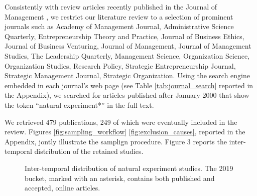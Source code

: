Consistently with review articles recently published in the Journal of
Management \parencite[e.g.][]{gonzalez2018,rindova2018}, we restrict our
literature review to a selection of prominent journals such as Academy of
Management Journal, Administrative Science Quarterly, Entrepreneurship Theory
and Practice, Journal of Business Ethics, Journal of Business Venturing, Journal
of Management, Journal of Management Studies, The Leadership Quarterly,
Management Science, Organization Science, Organization Studies, Research Policy,
Strategic Entrepreneurship Journal, Strategic Management Journal, Strategic
Organization.  Using the search engine embedded in each journal's web page (see
Table \ref{tab:journal_search} reported in the Appendix), we searched for
articles published after January 2000 that show the token ``natural
experiment*'' in the full text.

We retrieved 479 publications, 249 of which were eventually included in the
review. Figures \ref{fig:sampling_workflow} \ref{fig:exclusion_causes}, reported in the Appendix, jontly illustrate
the samplign procedure. Figure 3 reports the inter-temporal distribution of the retained studies.

\begin{figure}[!htbp]
    \sffamily
    \centering
    
    \caption{Inter-temporal distribution of natural experiment studies.
    The 2019 bucket, marked with an asterisk, contains both published and 
    accepted, online articles.}
    \label{fig:studies_over_time}
\end{figure}


